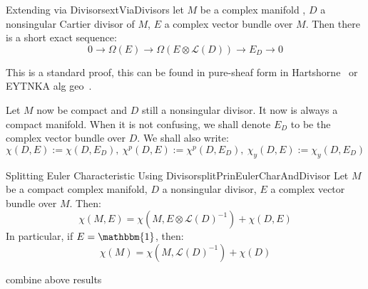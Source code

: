 \documentclass{book}
\newcommand{\CL}{{\mathcal{L}}}
\begin{document}
\begin{thm}{Extending via Divisors}{extViaDivisors}
  let $M$ be a complex manifold , $D$ a nonsingular Cartier divisor of $M$, $E$ a complex vector bundle over
  $M$. Then there is a short exact sequence:
  \[
    0 \to \Omega(E) \to \Omega(E\otimes \CL(D)) \to E_D \to 0
  \]
\end{thm}

\begin{Proof}
  This is a standard proof, this can be found in pure-sheaf form in
  Hartshorne~\cite[chapter~2?]{hartshorneAlgebraicGeometry2013} or EYTNKA alg geo~\cite{NateAlgGeo}.
\end{Proof}

Let $M$ now be compact and $D$ still a nonsingular divisor. It now is always a compact manifold. When it is
not confusing, we shall denote $E_D$ to be the complex vector bundle over $D$. We shall also write:
\[
  \chi(D, E) := \chi(D, E_D),\ \chi^p(D, E) := \chi^p(D, E_D),\ \chi_y(D, E) := \chi_y(D, E_D)
\]
\begin{thm}{Splitting Euler Characteristic Using Divisor}{splitPrinEulerCharAndDivisor}
  Let $M$ be a compact complex manifold, $D$ a nonsingular divisor, $E$ a complex vector bundle over $M$. Then:
  \[
    \chi(M,E) = \chi(M, E\otimes \CL(D)^{-1}) + \chi(D, E)
  \]
  In particular, if $E = \mathbbm{1}$, then:
  \[
    \chi(M) = \chi(M, \CL(D)^{-1}) + \chi(D)
  \]
\end{thm}

\begin{Proof}
  combine above results
\end{Proof}
\end{document}
